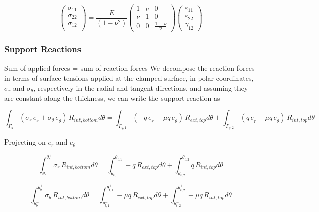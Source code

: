 \documentclass[12pt]{article}
\begin{document}
\begin{equation}
    \begin{pmatrix}
    \sigma_{11} \\
    \sigma_{22} \\
    \sigma_{12} \\
    \end{pmatrix}= \frac{E}{(1-\nu^2)}\begin{pmatrix}
    1 &  \nu & 0  \\
    \nu & 1 & 0 \\
    0 & 0 & \frac{1-\nu}{2} 
    \end{pmatrix}
    \begin{pmatrix}
    \varepsilon_{11} \\
    \varepsilon_{22} \\
    \gamma_{12}
    \end{pmatrix}
\end{equation}


\subsubsection{Support Reactions}

Sum of applied forces = sum of reaction forces 
We decompose the reaction forces in terms of surface tensions applied at the clamped surface, in polar coordinates, $\sigma_r$ and $\sigma_\theta$, respectively in the radial and tangent directions, and assuming they are constant along the thickness, we can write the support reaction as

\begin{equation}
    \int_{\Gamma_u} \left( \sigma_r \,\underline{e}_r + \sigma_\theta \,\underline{e}_\theta \right) \, R_{int,bottom} d\theta 
    = 
    \int_{\Gamma_{q,1}} \left( -q \,\underline{e}_r -  \mu q\,\underline{e}_\theta \right) \, R_{ext,top} d\theta 
    + 
    \int_{\Gamma_{q,2}} \left( q \,\underline{e}_r -  \mu q\,\underline{e}_\theta \right) \, R_{int,top} d\theta 
\end{equation}

Projecting on $e_r$ and $e_\theta$

\begin{equation}
    \int_{\theta_b^-}^{\theta_b^+} \sigma_r \, R_{int,bottom} d\theta 
    = 
    \int_{\theta_{t,1}^-}^{\theta_{t,1}^+}  -q \, R_{ext,top} d\theta 
    + 
    \int_{\theta_{t,2}^-}^{\theta_{t,2}^+} q \, R_{int,top} d\theta 
\end{equation}

\begin{equation}
    \int_{\theta_b^-}^{\theta_b^+} \sigma_\theta\, R_{int,bottom} d\theta 
    = 
    \int_{\theta_{t,1}^-}^{\theta_{t,1}^+} - \mu q\, R_{ext,top} d\theta 
    + 
    \int_{\theta_{t,2}^-}^{\theta_{t,2}^+}  -  \mu q \, R_{int,top} d\theta 
\end{equation}
\end{document}
